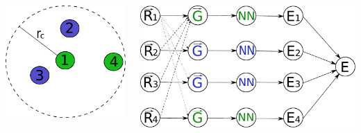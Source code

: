 \documentclass{beamer}
\begin{document}
\begin{frame}

\begin{columns}[c] %
  \begin{column}[c]{0.35\linewidth} %
   \centering
   \includegraphics[width=\linewidth]{../Figures/Presentation/cutoffSphere.pdf}
  \end{column}
  \begin{column}[c]{0.65\linewidth} %
   \includegraphics[width=\linewidth]{../Figures/Presentation/BehlerParrinello.pdf}
  \end{column}
\end{columns}

\end{frame}
\end{document}

